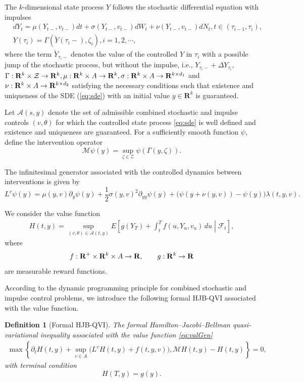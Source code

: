 \documentclass[12pt]{article}
\newtheorem{definition}[thm]{Definition}
\begin{document}
The $k$-dimensional state process $Y$ follows the stochastic differential equation with impulses
\begin{align}\label{eq:sde}
  &dY_t = \mu(Y_{t-}, v_{t-})dt + \sigma(Y_{t-}, v_{t-}) dW_t + \nu(Y_{t-}, v_{t-})dN_t, t \in (\tau_{i-1}, \tau_{i}), \\
  &Y(\tau_i) = \Gamma(\check{Y}(\tau_i-), \zeta_i), i = 1, 2, \cdots, 
\end{align}
where the term $\check{Y}_{\tau_i-}$ denotes the value of the controlled $Y$ in ${\tau_i}$ with a possible jump of the
stochastic process, but without the impulse, i.e., $Y_{\tau_i-} + \Delta Y_{\tau_i}$, \ $\Gamma: {\bf R}^k \times \mathcal{Z} \rightarrow {\bf R}^k, \mu: {\bf R}^k \times A \rightarrow {\bf R}^k, \sigma: {\bf R}^k \times A \rightarrow {\bf R}^{k\times d_1}$ and $\nu: {\bf R}^k \times A \rightarrow {\bf R}^{k\times d_2}$
satisfying the necessary conditions such that existence and uniqueness of the SDE (\ref{eq:sde}) with an initial value $y \in \textbf{R}^k$ is guaranteed.

Let $\mathcal{A}(s,y)$ denote the set of admissible combined stochastic and impulse controls $(v,\theta)$ for which the controlled state process \eqref{eq:sde} is well defined and existence and uniqueness are guaranteed.
For a sufficiently smooth function $\psi$, define the intervention operator
\[
\mathcal{M}\psi(y)
=
\sup_{\zeta\in\mathcal Z}
\psi(\Gamma(y,\zeta)).
\]

The infinitesimal generator associated with the controlled dynamics between interventions is given by
\[
L^v\psi(y)
=
\mu(y,v)\partial_y\psi(y)
+
\frac{1}{2}\sigma(y,v)^2\partial_{yy}\psi(y)
+
\bigl(
\psi(y+\nu(y,v))
-
\psi(y)
\bigr)
\lambda(t,y,v).
\]

We consider the value function
\begin{align}\label{eq:valGen}
H(t,y)
=
\sup_{(v,\theta)\in\mathcal A(t,y)}
E\left[
g(Y_T)
+
\int_t^T
f(u,Y_u,v_u)\,du
\middle|
\mathcal F_t
\right],
\end{align}
where
\[
f:{\bf R}^+\times{\bf R}^k\times A\to{\bf R},
\qquad
g:{\bf R}^k\to{\bf R}
\]
are measurable reward functions.

According to the dynamic programming principle for combined stochastic and impulse control problems, we introduce the following formal HJB-QVI associated with the value function.
\begin{definition}[Formal HJB-QVI]
  The formal Hamilton--Jacobi--Bellman quasi-variational inequality associated with the value function \eqref{eq:valGen}
\begin{align}
\max\left\{
\partial_tH(t,y)
+
\sup_{v\in A}
\bigl(
L^vH(t,y)
+
f(t,y,v)
\bigr),
\mathcal{M}H(t,y)-H(t,y)
\right\}
=
0,
\label{HJBQVI}
\end{align}
with terminal condition
\[
H(T,y)=g(y).
\]
\end{definition}
\end{document}
